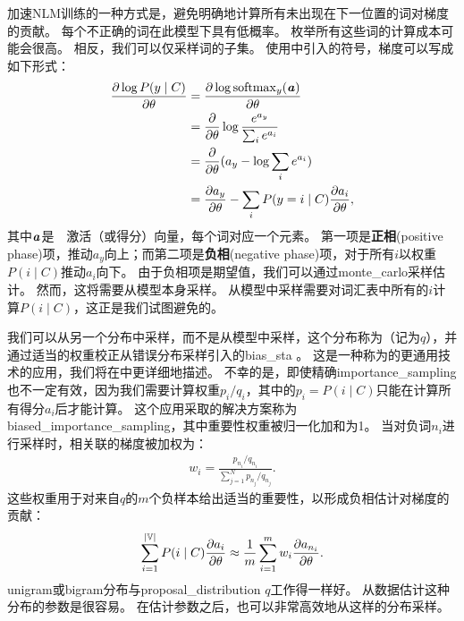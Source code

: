 \subsubsection{}
\label{sec:importance_sampling_chap12}
加速\gls{NLM}训练的一种方式是，避免明确地计算所有未出现在下一位置的词对梯度的贡献。
每个不正确的词在此模型下具有低概率。
枚举所有这些词的计算成本可能会很高。
相反，我们可以仅采样词的子集。
使用中引入的符号，梯度可以写成如下形式：
\begin{align}
 \frac{\partial \log P(y \mid C)}{\partial \theta} &= \frac{\partial \log {\rm softmax}_y(\boldsymbol{\mathit{a}})}{\partial \theta} \\ 
  &= \frac{\partial}{\partial \theta} \log \frac{e^{a_y}}{\sum_i e^{a_i}} \\ 
 &= \frac{\partial}{\partial \theta} (a_y - \log \sum_i e^{a_i}) \\ 
 &= \frac{\partial a_y}{\partial \theta}  - \sum_i P(y = i \mid C) \frac{\partial a_i}{\partial \theta},
\end{align}
其中$\boldsymbol{\mathit{a}}$是~~激活（或得分）向量，每个词对应一个元素。
第一项是\textbf{正相}(positive phase)项，推动$a_y$向上；而第二项是\textbf{负相}(negative phase)项，对于所有$i$以权重$P(i \mid C)$推动$a_i$向下。
由于负相项是期望值，我们可以通过\gls{monte_carlo}采样估计。
然而，这将需要从模型本身采样。
从模型中采样需要对词汇表中所有的$i$计算$P(i \mid C)$，这正是我们试图避免的。

我们可以从另一个分布中采样，而不是从模型中采样，这个分布称为（记为$q$），并通过适当的权重校正从错误分布采样引入的\gls{bias_sta} \citep{Bengio+Senecal-2003-small,Bengio+Senecal-2008}。
这是一种称为的更通用技术的应用，我们将在中更详细地描述。
不幸的是，即使精确\gls{importance_sampling}也不一定有效，因为我们需要计算权重$p_i / q_i$，其中的$p_i = P(i \mid C)$只能在计算所有得分$a_i$后才能计算。
这个应用采取的解决方案称为\gls{biased_importance_sampling}，其中重要性权重被归一化加和为1。
当对负词$n_i$进行采样时，相关联的梯度被加权为：
\begin{align}
  w_i = \frac{p_{n_i} / q_{n_i}}{\sum_{j=1}^N p_{n_j} / q_{n_j}}.
\end{align}
这些权重用于对来自$q$的$m$个负样本给出适当的重要性，以形成负相估计对梯度的贡献：
\begin{align}
  \sum_{i=1}^{|\mathbb{V}|} P(i \mid C) \frac{\partial a_i}{\partial \theta}  \approx \frac{1}{m} \sum_{i=1}^m w_i \frac{\partial a_{n_i}}{\partial \theta}.
  \end{align}
  \gls{unigram}或\gls{bigram}分布与\gls{proposal_distribution} $q$工作得一样好。
从数据估计这种分布的参数是很容易。
在估计参数之后，也可以非常高效地从这样的分布采样。

